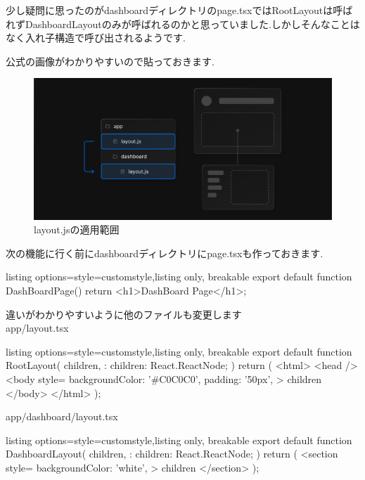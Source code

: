 少し疑問に思ったのがdashboardディレクトリのpage.tsxではRootLayoutは呼ばれずDashboardLayoutのみが呼ばれるのかと思っていました.しかしそんなことはなく入れ子構造で呼び出されるようです.

公式の画像がわかりやすいので貼っておきます.
\begin{figure}[H]
  \centering
  \includegraphics[width=12cm]{./image/03-Tech/chap4/02.png}
  \caption{layout.jsの適用範囲}
\end{figure}

次の機能に行く前にdashboardディレクトリにpage.tsxも作っておきます.
\begin{tcblisting}{listing options={style=customstyle},listing only, breakable}
  export default function DashBoardPage() {
      return <h1>DashBoard Page</h1>;
    }

\end{tcblisting}


違いがわかりやすいように他のファイルも変更します\\
app/layout.tsx
\begin{tcblisting}{listing options={style=customstyle},listing only, breakable}
  export default function RootLayout({
      children,
    }: {
  children: React.ReactNode;
  }) {
  return (
  <html>
  <head />
  <body
  style={{
      backgroundColor: '#C0C0C0',
      padding: '50px',
    }}
  >
    {children}
  </body>
  </html>
  );
  }

\end{tcblisting}



app/dashboard/layout.tsx
\begin{tcblisting}{listing options={style=customstyle},listing only, breakable}
  export default function DashboardLayout({
      children,
    }: {
  children: React.ReactNode;
  }) {
  return (
  <section
  style={{
      backgroundColor: 'white',
    }}
  >
    {children}
  </section>
  );
  }
\end{tcblisting}



